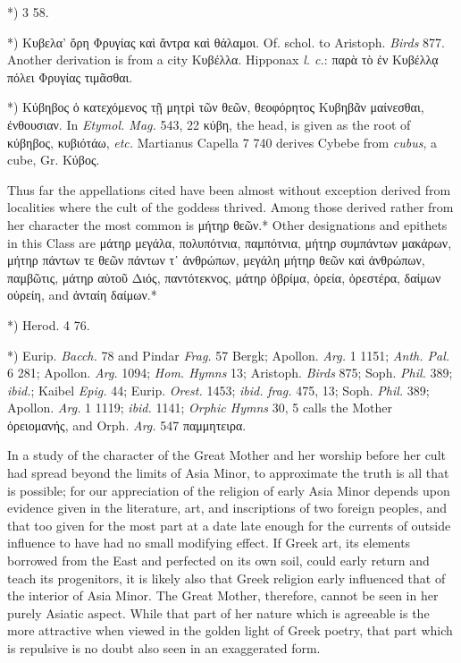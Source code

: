 \documentclass[a4paper, 11pt, oneside, polutonikogreek, english]{article}
\begin{document}
*) 3 58.

*) Κυβελα' ὄρη Φρυγίας καὶ ἄντρα καὶ θάλαμοι. Of. schol. to Aristoph. \emph{Birds} 877. Another derivation is from a city Κυβέλλα. Hipponax \emph{l. c.}: παρὰ τὸ ἐν Κυβέλλᾳ πόλει Φρυγίας τιμᾶσθαι.

*) Κύβηβος ὁ κατεχόμενος τῇ μητρὶ τῶν θεῶν, θεοφόρητος Κυβηβᾶν μαίνεσθαι, ἐνθουσιαν. In \emph{Etymol. Mag.} 543, 22 κύβη, the head, is given as the root of κύβηβος, κυβιότάω, \emph{etc.} Martianus Capella 7 740 derives Cybebe from \emph{cubus}, a cube, Gr. Κύβος.

Thus far the appellations cited have been almost without exception derived from localities where the cult of the goddess thrived. Among those derived rather from her character the most common is μήτηρ θεῶν.* Other designations and epithets in this Class are μάτηρ μεγάλα, πολυπότνια, παμπότνια, μήτηρ συμπάντων μακάρων, μήτηρ πάντων τε θεῶν πάντων τ᾽ ἀνθρώπων, μεγάλη μήτηρ θεῶν καὶ ἀνθρώπων, παμβῶτις, μάτηρ αὐτοῦ Διός, παντότεκνος, μάτηρ ὀβρίμα, ὀρεία, ὀρεστέρα, δαίμων οὐρείη, and ἀνταίη δαίμων.*

*) Herod. 4 76.

*) Eurip. \emph{Bacch.} 78 and Pindar \emph{Frag.} 57 Bergk; Apollon. \emph{Arg.} 1 1151; \emph{Anth. Pal.} 6 281; Apollon. \emph{Arg.} 1094; \emph{Hom. Hymns} 13; Aristoph. \emph{Birds} 875; Soph. \emph{Phil.} 389; \emph{ibid.}; Kaibel \emph{Epig.} 44; Eurip. \emph{Orest.} 1453; \emph{ibid.} \emph{frag.} 475, 13; Soph. \emph{Phil.} 389; Apollon. \emph{Arg.} 1 1119; \emph{ibid.} 1141; \emph{Orphic Hymns} 30, 5 calls the Mother ὀρειομανής, and Orph. \emph{Arg.} 547 παμμητειρα.

In a study of the character of the Great Mother and her worship before her cult had spread beyond the limits of Asia Minor, to approximate the truth is all that is possible; for our appreciation of the religion of early Asia Minor depends upon evidence given in the literature, art, and inscriptions of two foreign peoples, and that too given for the most part at a date late enough for the currents of outside influence to have had no small modifying effect. If Greek art, its elements borrowed from the East and perfected on its own soil, could early return and teach its progenitors, it is likely also that Greek religion early influenced that of the interior of Asia Minor. The Great Mother, therefore, cannot be seen in her purely Asiatic aspect. While that part of her nature which is agreeable is the more attractive when viewed in the golden light of Greek poetry, that part which is repulsive is no doubt also seen in an exaggerated form.
\end{document}
